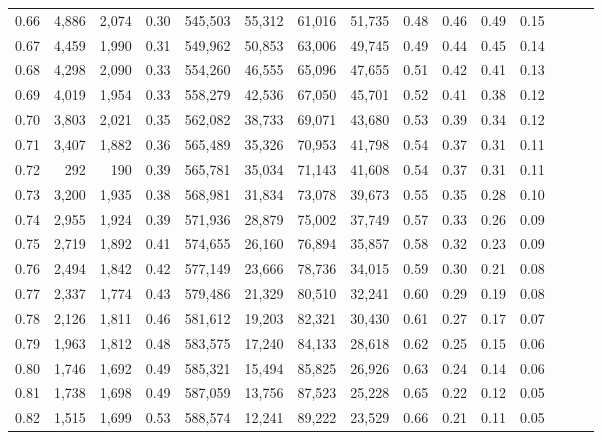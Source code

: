\begin{tabular}{rrrrrrrrrrrrrrr}
0.66 &   4,886 &  2,074 &  0.30 &  545,503 &   55,312 &   61,016 &   51,735 &  0.48 &  0.46 &  0.49 &      0.15 \\
0.67 &   4,459 &  1,990 &  0.31 &  549,962 &   50,853 &   63,006 &   49,745 &  0.49 &  0.44 &  0.45 &      0.14 \\
0.68 &   4,298 &  2,090 &  0.33 &  554,260 &   46,555 &   65,096 &   47,655 &  0.51 &  0.42 &  0.41 &      0.13 \\
0.69 &   4,019 &  1,954 &  0.33 &  558,279 &   42,536 &   67,050 &   45,701 &  0.52 &  0.41 &  0.38 &      0.12 \\
0.70 &   3,803 &  2,021 &  0.35 &  562,082 &   38,733 &   69,071 &   43,680 &  0.53 &  0.39 &  0.34 &      0.12 \\
0.71 &   3,407 &  1,882 &  0.36 &  565,489 &   35,326 &   70,953 &   41,798 &  0.54 &  0.37 &  0.31 &      0.11 \\
0.72 &     292 &    190 &  0.39 &  565,781 &   35,034 &   71,143 &   41,608 &  0.54 &  0.37 &  0.31 &      0.11 \\
0.73 &   3,200 &  1,935 &  0.38 &  568,981 &   31,834 &   73,078 &   39,673 &  0.55 &  0.35 &  0.28 &      0.10 \\
0.74 &   2,955 &  1,924 &  0.39 &  571,936 &   28,879 &   75,002 &   37,749 &  0.57 &  0.33 &  0.26 &      0.09 \\
0.75 &   2,719 &  1,892 &  0.41 &  574,655 &   26,160 &   76,894 &   35,857 &  0.58 &  0.32 &  0.23 &      0.09 \\
0.76 &   2,494 &  1,842 &  0.42 &  577,149 &   23,666 &   78,736 &   34,015 &  0.59 &  0.30 &  0.21 &      0.08 \\
0.77 &   2,337 &  1,774 &  0.43 &  579,486 &   21,329 &   80,510 &   32,241 &  0.60 &  0.29 &  0.19 &      0.08 \\
0.78 &   2,126 &  1,811 &  0.46 &  581,612 &   19,203 &   82,321 &   30,430 &  0.61 &  0.27 &  0.17 &      0.07 \\
0.79 &   1,963 &  1,812 &  0.48 &  583,575 &   17,240 &   84,133 &   28,618 &  0.62 &  0.25 &  0.15 &      0.06 \\
0.80 &   1,746 &  1,692 &  0.49 &  585,321 &   15,494 &   85,825 &   26,926 &  0.63 &  0.24 &  0.14 &      0.06 \\
0.81 &   1,738 &  1,698 &  0.49 &  587,059 &   13,756 &   87,523 &   25,228 &  0.65 &  0.22 &  0.12 &      0.05 \\
0.82 &   1,515 &  1,699 &  0.53 &  588,574 &   12,241 &   89,222 &   23,529 &  0.66 &  0.21 &  0.11 &      0.05 \\

\end{tabular}
